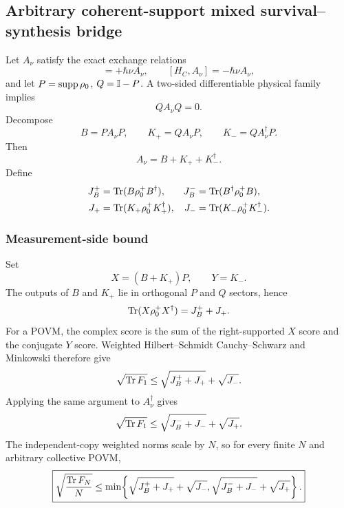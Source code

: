 
\subsection{Arbitrary coherent-support mixed survival--synthesis bridge}
\label{supp:mixed-full-proof}

Let $A_\nu$ satisfy the exact exchange relations
\begin{equation}
[H_S,A_\nu]=+\hbar\nu A_\nu,
\qquad
[H_C,A_\nu]=-\hbar\nu A_\nu,
\end{equation}
and let $P=\operatorname{supp}\rho_0$, $Q=\mathbb I-P$. A two-sided differentiable physical family implies
\begin{equation}
QA_\nu Q=0.
\end{equation}
Decompose
\begin{equation}
B=PA_\nu P,
\qquad
K_+=QA_\nu P,
\qquad
K_-=QA_\nu^\dagger P.
\label{eq:mixed-proof-decomp}
\end{equation}
Then
\begin{equation}
A_\nu=B+K_++K_-^\dagger.
\end{equation}
Define
\begin{align}
J_B^+&=\operatorname{Tr}(B\rho_0^+B^\dagger),&
J_B^-&=\operatorname{Tr}(B^\dagger\rho_0^+B),\\
J_+&=\operatorname{Tr}(K_+\rho_0^+K_+^\dagger),&
J_-&=\operatorname{Tr}(K_-\rho_0^+K_-^\dagger).
\end{align}

\subsubsection{Measurement-side bound}

Set
\begin{equation}
X=(B+K_+)P,
\qquad
Y=K_-.
\end{equation}
The outputs of $B$ and $K_+$ lie in orthogonal $P$ and $Q$ sectors, hence
\begin{equation}
\operatorname{Tr}(X\rho_0^+X^\dagger)=J_B^++J_+.
\end{equation}
For a POVM, the complex score is the sum of the right-supported $X$ score and the conjugate $Y$ score. Weighted Hilbert--Schmidt Cauchy--Schwarz and Minkowski therefore give
\begin{equation}
\sqrt{\operatorname{Tr} F_1}
\le
\sqrt{J_B^++J_+}+\sqrt{J_-}.
\end{equation}
Applying the same argument to $A_\nu^\dagger$ gives
\begin{equation}
\sqrt{\operatorname{Tr} F_1}
\le
\sqrt{J_B^-+J_-}+\sqrt{J_+}.
\end{equation}
The independent-copy weighted norms scale by $N$, so for every finite $N$ and arbitrary collective POVM,
\begin{equation}
\boxed{
\sqrt{\frac{\operatorname{Tr} F_N}{N}}
\le
\min\!\left\{
\sqrt{J_B^++J_+}+\sqrt{J_-},
\sqrt{J_B^-+J_-}+\sqrt{J_+}
\right\}.
}
\label{eq:mixed-proof-measurement}
\end{equation}

